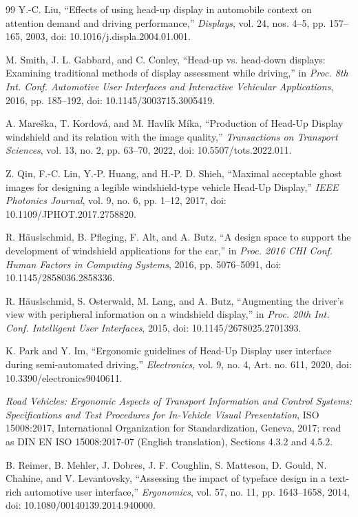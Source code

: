 \begin{thebibliography}{99}
 Y.-C. Liu, ``Effects of using head-up display in automobile context on attention demand and driving performance,'' \emph{Displays}, vol. 24, nos. 4--5, pp. 157--165, 2003, doi: 10.1016/j.displa.2004.01.001.

 M. Smith, J. L. Gabbard, and C. Conley, ``Head-up vs. head-down displays: Examining traditional methods of display assessment while driving,'' in \emph{Proc. 8th Int. Conf. Automotive User Interfaces and Interactive Vehicular Applications}, 2016, pp. 185--192, doi: 10.1145/3003715.3005419.

 A. Mare\v ska, T. Kordov\'a, and M. Havl\'ik M\'ika, ``Production of Head-Up Display windshield and its relation with the image quality,'' \emph{Transactions on Transport Sciences}, vol. 13, no. 2, pp. 63--70, 2022, doi: 10.5507/tots.2022.011.

 Z. Qin, F.-C. Lin, Y.-P. Huang, and H.-P. D. Shieh, ``Maximal acceptable ghost images for designing a legible windshield-type vehicle Head-Up Display,'' \emph{IEEE Photonics Journal}, vol. 9, no. 6, pp. 1--12, 2017, doi: 10.1109/JPHOT.2017.2758820.

 R. H\"auslschmid, B. Pfleging, F. Alt, and A. Butz, ``A design space to support the development of windshield applications for the car,'' in \emph{Proc. 2016 CHI Conf. Human Factors in Computing Systems}, 2016, pp. 5076--5091, doi: 10.1145/2858036.2858336.

 R. H\"auslschmid, S. Osterwald, M. Lang, and A. Butz, ``Augmenting the driver's view with peripheral information on a windshield display,'' in \emph{Proc. 20th Int. Conf. Intelligent User Interfaces}, 2015, doi: 10.1145/2678025.2701393.

 K. Park and Y. Im, ``Ergonomic guidelines of Head-Up Display user interface during semi-automated driving,'' \emph{Electronics}, vol. 9, no. 4, Art. no. 611, 2020, doi: 10.3390/electronics9040611.

 \emph{Road Vehicles: Ergonomic Aspects of Transport Information and Control Systems: Specifications and Test Procedures for In-Vehicle Visual Presentation}, ISO 15008:2017, International Organization for Standardization, Geneva, 2017; read as DIN EN ISO 15008:2017-07 (English translation), Sections 4.3.2 and 4.5.2.

 B. Reimer, B. Mehler, J. Dobres, J. F. Coughlin, S. Matteson, D. Gould, N. Chahine, and V. Levantovsky, ``Assessing the impact of typeface design in a text-rich automotive user interface,'' \emph{Ergonomics}, vol. 57, no. 11, pp. 1643--1658, 2014, doi: 10.1080/00140139.2014.940000.


\end{thebibliography}
